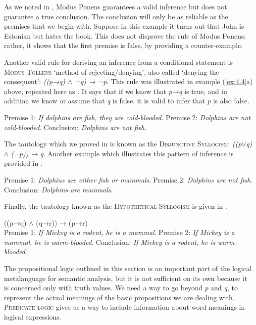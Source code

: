 As we noted in , Modus Ponens guarantees a valid inference but does not guarantee a true conclusion. The conclusion will only be as reliable as the premises that we begin with. Suppose in this example it turns out that John is Estonian but hates the book. This does not disprove the rule of Modus Ponens; rather, it shows that the first premise is false, by providing a counter-example.



Another valid rule for deriving an inference from a conditional statement is \textsc{Modus Tollens} ‘method of rejecting/denying’, also called ‘denying the consequent’: \textit{((p→q) $\wedge$ ¬q) → ¬p}. This rule was illustrated in example (\ref{ex:4.4}a) above, repeated here as . It says that if we know that \textit{p→q} is true, and in addition we know or assume that \textit{q} is false, it is valid to infer that \textit{p} is also false.

\settowidth{}
\ea \label{ex:4.18}
Premise 1: \textit{If dolphins are fish, they are cold-blooded.} 
Premise 2: \textit{Dolphins are not cold-blooded}.   
\FelixHRule
Conclusion: \textit{Dolphins are not fish}.   
\z


The tautology which we proved in  is known as the \textsc{Disjunctive Syllogism}: \textit{((p$\vee$q) $\wedge$ (¬p)) → q}. Another example which illustrates this pattern of inference is provided in .


\ea \label{ex:4.19}
Premise 1: \textit{Dolphins are either fish or mammals}.  
Premise 2: \textit{Dolphins are not fish}.  
\FelixHRule
Conclusion: \textit{Dolphins are mammals}.   
\z


Finally, the tautology known as the \textsc{Hypothetical} \textsc{Syllogism} is given in .


\ea \label{ex:4.20}
((p→q) $\wedge$ (q→r)) → (p→r)\\
Premise 1: \textit{If Mickey is a rodent, he is a mammal}.  
Premise 2: \textit{If Mickey is a mammal, he is warm-blooded}.  
\FelixHRule
Conclusion: \textit{If Mickey is a rodent, he is warm-blooded}.  
\z

The propositional logic outlined in this section is an important part of the logical metalanguage for semantic analysis, but it is not sufficient on its own because it is concerned only with truth values. We need a way to go beyond \textit{p} and \textit{q}, to represent the actual meanings of the basic propositions we are dealing with. \textsc{Predicate logic} gives us a way to include information about word meanings in logical expressions.
\newpage 

